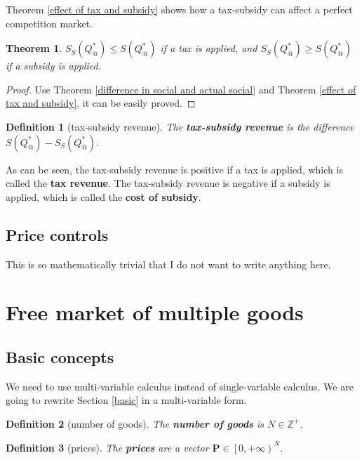 \documentclass{article}
\newtheorem{theorem}{Theorem}
\newtheorem{definition}{Definition}
\begin{document}
Theorem \ref{effect of tax and subsidy} shows how a tax-subsidy can affect a perfect competition market.

\begin{theorem}
$S_S\left(Q_@^*\right)\le S\left(Q_@^*\right)$ if a tax is applied, and $S_S\left(Q_@^*\right)\ge S\left(Q_@^*\right)$ if a subsidy is applied.
\end{theorem}
\begin{proof}
Use Theorem \ref{difference in social and actual social} and Theorem \ref{effect of tax and subsidy}, it can be easily proved.
\end{proof}

\begin{definition}[tax-subsidy revenue]
The \textbf{tax-subsidy revenue} is the difference $S\left(Q_@^*\right)-S_S\left(Q_@^*\right)$.
\end{definition}

As can be seen, the tax-subsidy revenue is positive if a tax is applied, which is called the \textbf{tax revenue}.
The tax-subsidy revenue is negative if a subsidy is applied, which is called the \textbf{cost of subsidy}.

\subsection{Price controls}

This is so mathematically trivial that I do not want to write anything here.

\section{Free market of multiple goods}

\subsection{Basic concepts}

We need to use multi-variable calculus instead of single-variable calculus.
We are going to rewrite Section \ref{basic} in a multi-variable form.

\begin{definition}[number of goods]
The \textbf{number of goods} is $N\in\mathbb Z^+$.
\end{definition}

\begin{definition}[prices]
The \textbf{prices} are a vector $\mathbf P\in\left[0,+\infty\right)^N$.
\end{definition}
\end{document}
